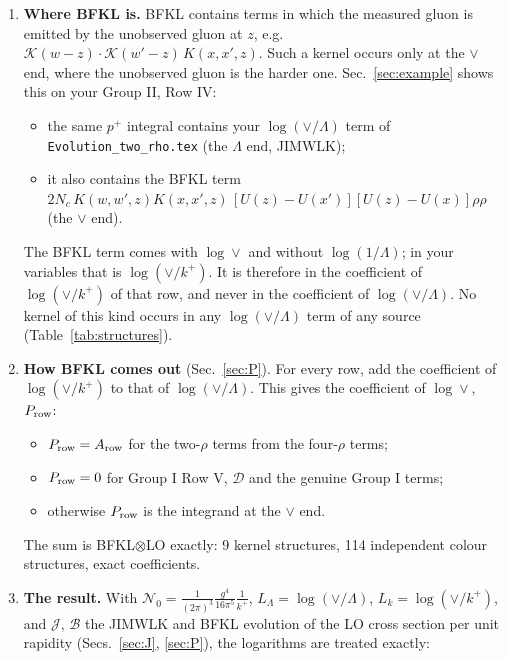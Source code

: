\documentclass[10pt]{article}
\numberwithin{equation}{section}
\newcommand{\KK}{\mathcal K}
\newcommand{\NO}{\mathcal N_0}
\newcommand{\LL}{L_\Lambda}
\newcommand{\Lk}{L_k}
\newcommand{\J}{\mathcal J}
\newcommand{\B}{\mathcal B}
\newcommand{\T}{\mathfrak T}
\newcommand{\PP}{\mathfrak P}
\begin{document}
\begin{enumerate}
Integrating out a gluon softer than the measured gluon is one step of the evolution of the target: JIMWLK. A row is an exact identity of the form $\T\log(\vee/\Lambda)+(\PP-\T)\log(\vee/k^+)+R$, with $\T$ ($\PP$) the integrand at the $\Lambda$ ($\vee$) end and $R$ free of both logarithms. The coefficients are unique (Sec.~\ref{sec:exact}).
\item \textbf{Where BFKL is.} BFKL contains terms in which the measured gluon is emitted by the unobserved gluon at $z$, e.g.\ $\KK(w-z)\cdot\KK(w'-z)\,K(x,x',z)$. Such a kernel occurs only at the $\vee$ end, where the unobserved gluon is the harder one. Sec.~\ref{sec:example} shows this on your Group II, Row IV:
\begin{itemize}
\item the same $p^+$ integral contains your $\log(\vee/\Lambda)$ term of \texttt{Evolution\_two\_rho.tex} (the $\Lambda$ end, JIMWLK);
\item it also contains the BFKL term $2N_c\,K(w,w',z)K(x,x',z)\,[U(z)-U(x')][U(z)-U(x)]\rho\rho$ (the $\vee$ end).
\end{itemize}
The BFKL term comes with $\log\vee$ and without $\log(1/\Lambda)$; in your variables that is $\log(\vee/k^+)$. It is therefore in the coefficient of $\log(\vee/k^+)$ of that row, and never in the coefficient of $\log(\vee/\Lambda)$. No kernel of this kind occurs in any $\log(\vee/\Lambda)$ term of any source (Table~\ref{tab:structures}).
\item \textbf{How BFKL comes out} (Sec.~\ref{sec:P}). For every row, add the coefficient of $\log(\vee/k^+)$ to that of $\log(\vee/\Lambda)$. This gives the coefficient of $\log\vee$, $P_{\rm row}$:
\begin{itemize}
\item $P_{\rm row}=A_{\rm row}$ for the two-$\rho$ terms from the four-$\rho$ terms;
\item $P_{\rm row}=0$ for Group I Row V, $\mathcal D$ and the genuine Group I terms;
\item otherwise $P_{\rm row}$ is the integrand at the $\vee$ end.
\end{itemize}
The sum is BFKL$\otimes$LO exactly: 9 kernel structures, 114 independent colour structures, exact coefficients.
\item \textbf{The result.} With $\NO=\frac{1}{(2\pi)^3}\frac{g^4}{16\pi^5}\frac1{k^+}$, $\LL=\log(\vee/\Lambda)$, $\Lk=\log(\vee/k^+)$, and $\J$, $\B$ the JIMWLK and BFKL evolution of the LO cross section per unit rapidity (Secs.~\ref{sec:J}, \ref{sec:P}), the logarithms are treated exactly:

\end{enumerate}
\end{document}
